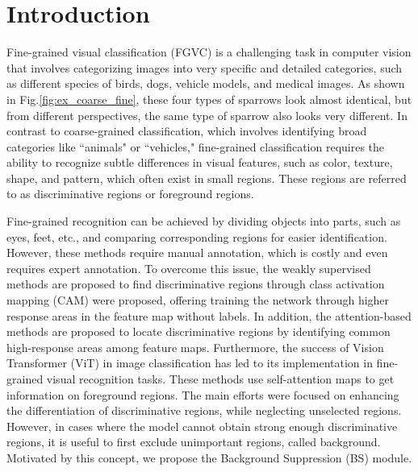 \documentclass[journal]{IEEEtran}
\begin{document}
\section{Introduction}

\IEEEPARstart
{F}{ine-grained} visual classification (FGVC) is a challenging task in computer vision that involves categorizing images into very specific and detailed categories, such as different species of birds\cite{CUB_200_2011}, dogs\cite{Stanford_Dogs}, vehicle models\cite{Stanford_Cars}, and medical images\cite{FGRDA}. As shown in Fig.\ref{fig:ex_coarse_fine}, these four types of sparrows look almost identical, but from different perspectives, the same type of sparrow also looks very different. 
In contrast to coarse-grained classification, which involves identifying broad categories like ``animals" or ``vehicles," fine-grained classification requires the ability to recognize subtle differences in visual features, such as color, texture, shape, and pattern, which often exist in small regions. These regions are referred to as discriminative regions or foreground regions.

Fine-grained recognition can be achieved by dividing objects into parts, such as eyes, feet, etc., and comparing corresponding regions for easier identification\cite{HPM,HOG_Alignments,TruesAboutDog, PB-RCNN,PS-CNN,PNDCN,SPDA-CNN}. However, these methods require manual annotation, which is costly and even requires expert annotation. To overcome this issue, the weakly supervised methods\cite{Granularity-Specific, Re-rank-Local, SAC, WS-DAN, S3Ns, MMP-ScPM, LR2M} are proposed to find discriminative regions through class activation mapping (CAM)\cite{CAM, Grad-CAM} were proposed, offering training the network through higher response areas in the feature map without labels.
 In addition, the attention-based methods\cite{MA-CNN, DCAL, API-Net, PCA-Net, BNT} are proposed to locate discriminative regions by identifying common high-response areas among feature maps. Furthermore, the success of Vision Transformer (ViT) in image classification has led to its implementation in fine-grained visual recognition tasks. These methods\cite{SACM, SIM-TRans, TransFG, FFVT, Vit-KG-PS, RAMS-Trans} use self-attention maps to get information on foreground regions. The main efforts were focused on enhancing the differentiation of discriminative regions, while neglecting unselected regions. However, in cases where the model cannot obtain strong enough discriminative regions, it is useful to first exclude unimportant regions, called background. Motivated by this concept, we propose the Background Suppression (BS) module.
\end{document}

